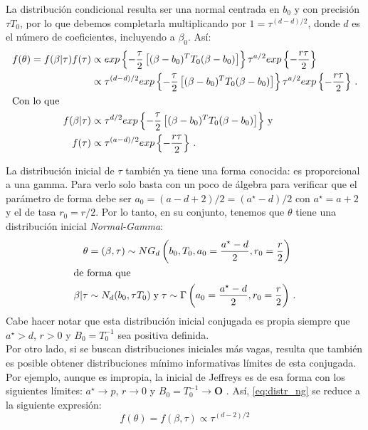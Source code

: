La distribución condicional resulta ser una normal centrada en $b_0$ y con precisión $\tau T_0$, por lo que debemos completarla multiplicando por $1=\tau^{(d-d)/2}$, donde $d$ es el número de coeficientes, incluyendo a $\beta_0$. Así: 
\begin{align} \label{eq:distr_ng}
f(\theta)= f(\beta|\tau)f(\tau) &\propto exp\left\lbrace -\dfrac{\tau}{2}\left[(\beta-b_0)^TT_0(\beta-b_0)\right] \right\rbrace \tau^{a/2} exp\left\lbrace -\dfrac{r\tau}{2}\right\rbrace \nonumber \\
&\propto \tau^{(d - d)/2} exp\left\lbrace -\dfrac{\tau}{2}\left[(\beta-b_0)^TT_0(\beta-b_0)\right] \right\rbrace \tau^{a/2} exp\left\lbrace -\dfrac{r\tau}{2}\right\rbrace \,. \nonumber\\
\intertext{Con lo que} \nonumber 
f(\beta|\tau) &\propto \tau^{d/2} exp\left\lbrace -\dfrac{\tau}{2}\left[(\beta-b_0)^TT_0(\beta-b_0)\right] \right\rbrace \,\text{y} \nonumber \\
f(\tau) &\propto \tau^{(a-d)/2} exp\left\lbrace -\dfrac{r\tau}{2}\right\rbrace \,.
\end{align}

La distribución inicial de $\tau$ también ya tiene una forma conocida: es proporcional a una gamma. Para verlo solo basta con un poco de álgebra para verificar que el parámetro de forma debe ser $a_0 = (a-d+2)/2=(a^\star-d)/2$ con $a^\star=a+2$ y el de tasa $r_0 = r/2$. Por lo tanto, en su conjunto, tenemos que $\theta$ tiene una distribución inicial \textit{Normal-Gamma}: 
\begin{align} 
\theta &= (\beta,\tau) \sim NG_d\left(b_0,T_0,a_0=\dfrac{a^\star-d}{2},r_0 =\dfrac{r}{2}\right) \nonumber \\
\intertext{de forma que}
\beta|\tau &\sim N_d(b_0,\tau T_0) \;\text{y}\; \tau \sim \Gamma\left(a_0 = \dfrac{a^\star-d}{2}, r_0 = \dfrac{r}{2}\right) \,.
\label{eq:normal_gamma}
\end{align}
Cabe hacer notar que esta distribución inicial conjugada es propia siempre que $a^\star > d $, $r > 0$ y $B_0 = T_0^{-1}$ sea positiva definida.\\ 

Por otro lado, si se buscan distribuciones iniciales más vagas, resulta que también es posible obtener distribuciones mínimo informativas límites de esta conjugada. Por ejemplo, aunque es impropia, la inicial de Jeffreys es de esa forma con los siguientes límites: $a^\star \rightarrow p $, $r \rightarrow 0$ y $B_0 = T_0^{-1} \rightarrow \mathbf{O}$ \parencite{GP98}. Así, \eqref{eq:distr_ng} se reduce a la siguiente expresión: 
\begin{equation} \label{eq:jeffreys_ng}
f(\theta) = f(\beta,\tau) \propto \tau^{(d-2)/2}
\end{equation}

